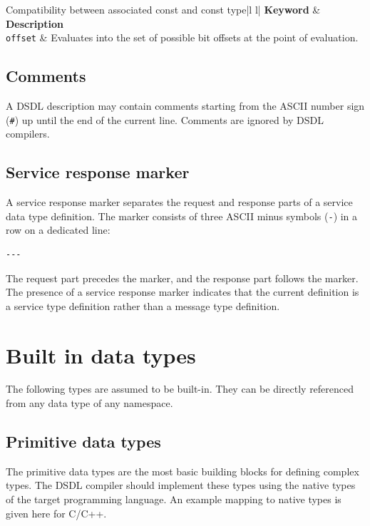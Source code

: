\begin{UAVCANSimpleTable}{Compatibility between associated const and const type}{|l l|}
\textbf{Keyword} & \textbf{Description} \\
\texttt{offset} & Evaluates into the set of possible bit offsets at the point of evaluation.
\end{UAVCANSimpleTable}

\subsection{Comments}

A DSDL description may contain comments starting from the ASCII number sign (\verb|#|)
up until the end of the current line.
Comments are ignored by DSDL compilers.

\subsection{Service response marker}\label{sec:dsdl_service_response_marker}

A service response marker separates the request and response parts of a service data type definition.
The marker consists of three ASCII minus symbols (\verb|-|) in a row on a dedicated line:

\begin{verbatim}
---
\end{verbatim}

The request part precedes the marker, and the response part follows the marker.
The presence of a service response marker indicates that the current definition is a
service type definition rather than a message type definition.

\section{Built in data types}

The following types are assumed to be built-in.
They can be directly referenced from any data type of any namespace.

\subsection{Primitive data types}\label{sec:dsdl_primitive_data_types}

The primitive data types are the most basic building blocks for defining complex types.
The DSDL compiler should implement these types using the native types of the target programming language.
An example mapping to native types is given here for C/C++.

